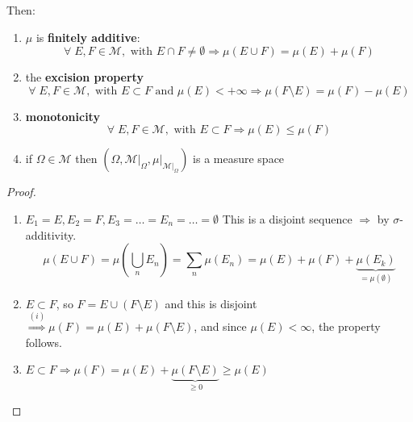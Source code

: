Then:
\begin{enumerate}
    \item \(\mu\) is \textbf{finitely additive}: 
    \[
        \forall \; E,F \in \mathcal{M}, \mbox{ with } E \cap F \not = \emptyset \Rightarrow
    \mu(E \cup F) = \mu(E) + \mu(F)
    \]
    \item the \textbf{excision property}
    \[
        \forall \; E, F \in \mathcal{M}, \mbox{ with } E \subset F \mbox{ and } \mu(E) < +\infty \Rightarrow \mu(F\setminus E) = \mu(F) - \mu(E)
    \]
    \item \textbf{monotonicity}
    \[
        \forall \; E, F \in \mathcal{M}, \mbox{ with } E \subset F \Rightarrow \mu(E) \leq \mu(F)
    \]
    \item if \(\Omega \in \mathcal{M}\) then \((\Omega, \mathcal{M}\vert_{\Omega}, \mu\vert_{\mathcal{M}\vert_{\Omega}})\) is a measure space
\end{enumerate}
\begin{proof}
     \begin{enumerate}
        \item \(E_1 = E, E_2 = F, E_3 = \ldots = E_n = \ldots = \emptyset\) 
        This is a disjoint sequence \(\Rightarrow\) by \(\sigma\)-additivity. 
        \[
            \mu(E \cup F) = \mu\left(\bigcup_{n} E_n\right) = \sum_n \mu(E_n) = \mu(E) + \mu(F) + \underbrace{\mu(E_k)}_{= \mu(\emptyset)}
        \] 
        \item \(E \subset F\), so \(F = E \cup (F \setminus E)\) and this is disjoint \(\overset{(i)}{\Rightarrow} \mu(F) = \mu(E) + \mu(F\setminus E)\), and since \(\mu(E) < \infty\), the property follows.
        \item \(E \subset F \Rightarrow \mu(F) = \mu(E) + \underbrace{\mu(F\setminus E)}_{\geq 0} \geq \mu(E)\)
     \end{enumerate}
    \end{proof}
